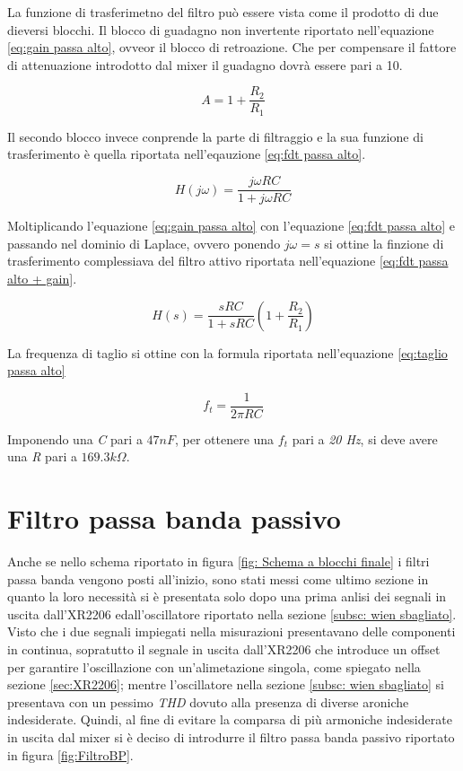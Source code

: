 \documentclass[titlepage]{report}
\begin{document}
La funzione di trasferimetno del filtro può essere vista come il prodotto di due dieversi blocchi. Il blocco di guadagno non invertente riportato nell'equazione \ref{eq:gain passa alto}, ovveor il blocco di retroazione. Che per compensare il fattore di attenuazione introdotto dal mixer il guadagno dovrà essere pari a 10. 

\begin{equation}
	\label{eq:gain passa alto}
	A = 1 + \frac{R_2}{R_1}
\end{equation}

Il secondo blocco invece conprende la parte di filtraggio e la sua funzione di trasferimento è quella riportata nell'eqauzione \ref{eq:fdt passa alto}.

\begin{equation}
	\label{eq:fdt passa alto}
	H(j\omega) = \frac{j\omega RC}{1 + j\omega RC}
\end{equation}

Moltiplicando l'equazione \ref{eq:gain passa alto} con l'equazione \ref{eq:fdt passa alto} e passando nel dominio di Laplace, ovvero ponendo \textit{$j\omega = s$} si ottine la finzione di trasferimento complessiava del filtro attivo riportata nell'equazione \ref{eq:fdt passa alto + gain}.

\begin{equation}
	\label{eq:fdt passa alto + gain}
	H(s) = \frac{sRC}{1 + sRC}(1 + \frac{R_2}{R_1})
\end{equation}

La frequenza di taglio si ottine con la formula riportata nell'equazione \ref{eq:taglio passa alto}

\begin{equation}
	\label{eq:taglio passa alto}
	f_t = \frac{1}{2\pi RC}
\end{equation}

Imponendo una \textit{C} pari a \textit{$47nF$}, per ottenere una $f_t$ pari a \textit{20 Hz}, si deve avere una \textit{R} pari a \textit{$169.3k\Omega$}.

\section{Filtro passa banda passivo}
\label{sc: passa banda teoria}
Anche se nello schema riportato in figura \ref{fig: Schema a blocchi finale} i filtri passa banda vengono posti all'inizio, sono stati messi come ultimo sezione in quanto la loro necessità si è presentata solo dopo una prima anlisi dei segnali in uscita dall'XR2206 edall'oscillatore riportato nella sezione \ref{subsc: wien sbagliato}. 
\noindent Visto che i due segnali impiegati nella misurazioni presentavano delle componenti in continua, sopratutto il segnale in uscita dall'XR2206 che introduce un offset per garantire l'oscillazione con un'alimetazione singola, come spiegato nella sezione \ref{sec:XR2206}; mentre l'oscillatore nella sezione \ref{subsc: wien sbagliato} si presentava con un pessimo \textit{THD} dovuto alla presenza di diverse aroniche indesiderate. Quindi, al fine di evitare la comparsa di più armoniche indesiderate in uscita dal mixer si è deciso di introdurre il filtro passa banda passivo riportato in figura \ref{fig:FiltroBP}.
\end{document}
